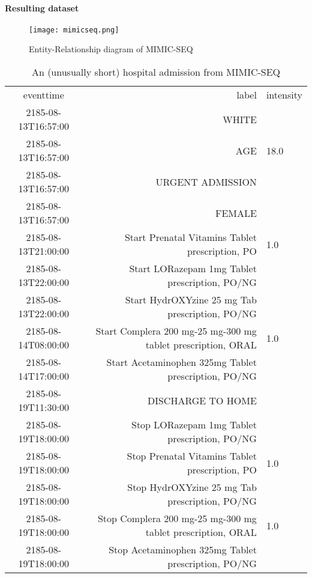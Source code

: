 \paragraph{Resulting dataset}

\begin{figure}
    \centering
    \texttt{[image: mimicseq.png]}
    \caption{Entity-Relationship diagram of MIMIC-SEQ}
    \label{fig:enter-label}
\end{figure}

\begin{table}[H]
    \centering
    \scriptsize
    \begin{tabular}{c|r|l}
    eventtime &	label &	intensity \\
    2185-08-13T16:57:00 &	WHITE	 & \\
    2185-08-13T16:57:00 &	AGE &	18.0 \\
    2185-08-13T16:57:00 &	URGENT ADMISSION &	 \\
    2185-08-13T16:57:00 &	FEMALE &	 \\
    2185-08-13T21:00:00 &	Start Prenatal Vitamins Tablet prescription, PO &	1.0 \\
    2185-08-13T22:00:00 &	Start LORazepam 1mg Tablet prescription, PO/NG &	 \\
    2185-08-13T22:00:00 &	Start HydrOXYzine 25 mg Tab prescription, PO/NG &	 \\
    2185-08-14T08:00:00 &	Start Complera 200 mg-25 mg-300 mg tablet prescription, ORAL &	1.0 \\
    2185-08-14T17:00:00 &	Start Acetaminophen 325mg Tablet prescription, PO/NG &	 \\
    2185-08-19T11:30:00 &	DISCHARGE TO HOME &	 \\
    2185-08-19T18:00:00 &	Stop LORazepam 1mg Tablet prescription, PO/NG &	 \\
    2185-08-19T18:00:00 &	Stop Prenatal Vitamins Tablet prescription, PO &	1.0 \\
    2185-08-19T18:00:00 &	Stop HydrOXYzine 25 mg Tab prescription, PO/NG &	 \\
    2185-08-19T18:00:00 &	Stop Complera 200 mg-25 mg-300 mg tablet prescription, ORAL &	1.0 \\
    2185-08-19T18:00:00 &	Stop Acetaminophen 325mg Tablet prescription, PO/NG &	 \\
    \end{tabular}
    \caption{An (unusually short) hospital admission from MIMIC-SEQ}
\end{table}

